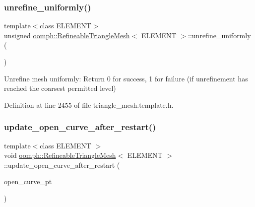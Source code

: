 \subsubsection{\texorpdfstring{unrefine\+\_\+uniformly()}{unrefine\_uniformly()}}
{\footnotesize\ttfamily template$<$class E\+L\+E\+M\+E\+NT$>$ \\
unsigned \hyperlink{classoomph_1_1RefineableTriangleMesh}{oomph\+::\+Refineable\+Triangle\+Mesh}$<$ E\+L\+E\+M\+E\+NT $>$\+::unrefine\+\_\+uniformly (\begin{DoxyParamCaption}{ }\end{DoxyParamCaption})\hspace{0.3cm}{\ttfamily [inline]}}



Unrefine mesh uniformly\+: Return 0 for success, 1 for failure (if unrefinement has reached the coarsest permitted level) 



Definition at line 2455 of file triangle\+\_\+mesh.\+template.\+h.

\mbox{\label{classoomph_1_1RefineableTriangleMesh_a8f136c97cfe472ca5a5a2791f490abf0}} 
\subsubsection{\texorpdfstring{update\+\_\+open\+\_\+curve\+\_\+after\+\_\+restart()}{update\_open\_curve\_after\_restart()}}
{\footnotesize\ttfamily template$<$class E\+L\+E\+M\+E\+NT $>$ \\
void \hyperlink{classoomph_1_1RefineableTriangleMesh}{oomph\+::\+Refineable\+Triangle\+Mesh}$<$ E\+L\+E\+M\+E\+NT $>$\+::update\+\_\+open\+\_\+curve\+\_\+after\+\_\+restart (\begin{DoxyParamCaption}\item[{Triangle\+Mesh\+Open\+Curve $\ast$\&}]{open\+\_\+curve\+\_\+pt }\end{DoxyParamCaption})\hspace{0.3cm}{\ttfamily [protected]}}



